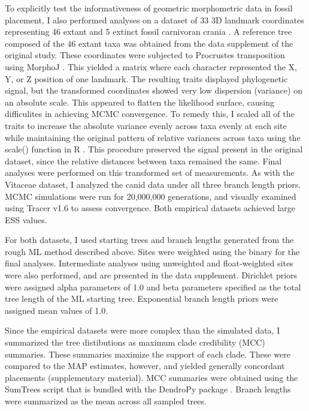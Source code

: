 \documentclass[12pt]{article}
\begin{document}
To explicitly test the informativeness of geometric morphometric data in
fossil placement, I also performed analyses on a dataset of 33 3D landmark
coordinates representing 46 extant and 5 extinct fossil carnivoran
crania \citep{jones2015impact}. A reference tree composed of the 46 extant
taxa was obtained from the data supplement of the original study. These
coordinates were subjected to Procrustes transposition using MorphoJ \citep{klingenberg2011morphoj}.
This yielded a matrix where each character represented the X, Y, or Z position of one landmark.
The resulting traits displayed phylogenetic signal, but the transformed
coordinates showed very low dispersion (variance) on an absolute scale.
This appeared to flatten the likelihood surface, causing difficulites in
achieving MCMC convergence. To remedy this, I scaled all of the traits
to increase the absolute variance evenly across taxa evenly at each site while
maintaining the original pattern of relative variances across taxa using the scale() function in R \citep{R}. This
procedure preserved the signal present in the original dataset, since the
relative distances between taxa remained the same. Final analyses were
performed on this transformed set of measurements. As with the
Vitaceae dataset, I analyzed the canid data under all three branch
length priors. MCMC simulations were run for 20,000,000 generations, and
visually examined using Tracer v1.6 to assess convergence. Both
empirical datasets achieved large ESS values.

For both datasets, I used starting trees and branch lengths generated
from the rough ML method described above. Sites were weighted using the
binary for the final analyses. Intermediate analyses using unweighted
and float-weighted sites were also performed, and are presented in the
data supplement. Dirichlet priors were assigned alpha parameters of 1.0
and beta parameters specified as the total tree length of the ML
starting tree. Exponential branch length priors were assigned mean
values of 1.0.

Since the empirical datasets were more complex than the simulated data,
I summarized the tree distibutions as maximum clade credibility (MCC)
summaries. These summaries maximize the support of each clade. These
were compared to the MAP estimates, however, and yielded generally
concordant placements (supplementary material). MCC summaries were
obtained using the SumTrees script that is bundled with the DendroPy
package \citep{sukumaran2010dendropy}. Branch lengths were summarized as
the mean across all sampled trees.
\end{document}
